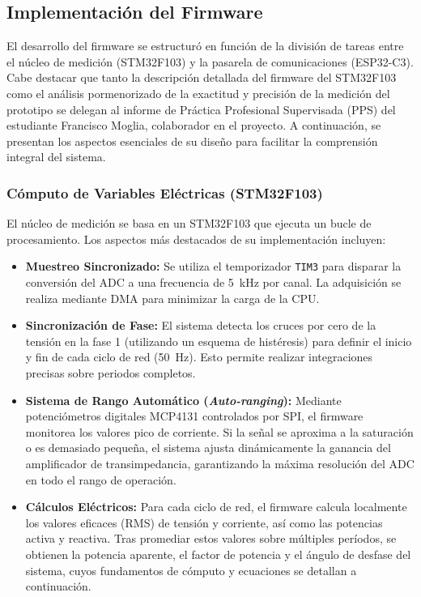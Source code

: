 \documentclass[12pt, a4paper]{article} %
\begin{document}
\subsection{Implementación del Firmware}

El desarrollo del firmware se estructuró en función de la división de tareas entre el núcleo de medición (STM32F103) y la pasarela de comunicaciones (ESP32-C3). Cabe destacar que tanto la descripción detallada del firmware del STM32F103 como el análisis pormenorizado de la exactitud y precisión de la medición del prototipo se delegan al informe de Práctica Profesional Supervisada (PPS) del estudiante Francisco Moglia, colaborador en el proyecto. A continuación, se presentan los aspectos esenciales de su diseño para facilitar la comprensión integral del sistema.

\subsubsection{Cómputo de Variables Eléctricas (STM32F103)}

El núcleo de medición se basa en un STM32F103 que ejecuta un bucle de procesamiento. Los aspectos más destacados de su implementación incluyen:

\begin{itemize}
  \item \textbf{Muestreo Sincronizado:} Se utiliza el temporizador \texttt{TIM3} para disparar la conversión del ADC a una frecuencia de \qty{5}{\kilo\hertz} por canal. La adquisición se realiza mediante DMA para minimizar la carga de la CPU.
  \item \textbf{Sincronización de Fase:} El sistema detecta los cruces por cero de la tensión en la fase 1 (utilizando un esquema de histéresis) para definir el inicio y fin de cada ciclo de red (\qty{50}{\hertz}). Esto permite realizar integraciones precisas sobre periodos completos.
  \item \textbf{Sistema de Rango Automático (\textit{Auto-ranging}):} Mediante potenciómetros digitales MCP4131 controlados por SPI, el firmware monitorea los valores pico de corriente. Si la señal se aproxima a la saturación o es demasiado pequeña, el sistema ajusta dinámicamente la ganancia del amplificador de transimpedancia, garantizando la máxima resolución del ADC en todo el rango de operación.
  \item \textbf{Cálculos Eléctricos:} Para cada ciclo de red, el firmware calcula localmente los valores eficaces (RMS) de tensión y corriente, así como las potencias activa y reactiva. Tras promediar estos valores sobre múltiples períodos, se obtienen la potencia aparente, el factor de potencia y el ángulo de desfase del sistema, cuyos fundamentos de cómputo y ecuaciones se detallan a continuación.
\end{itemize}
\end{document}
